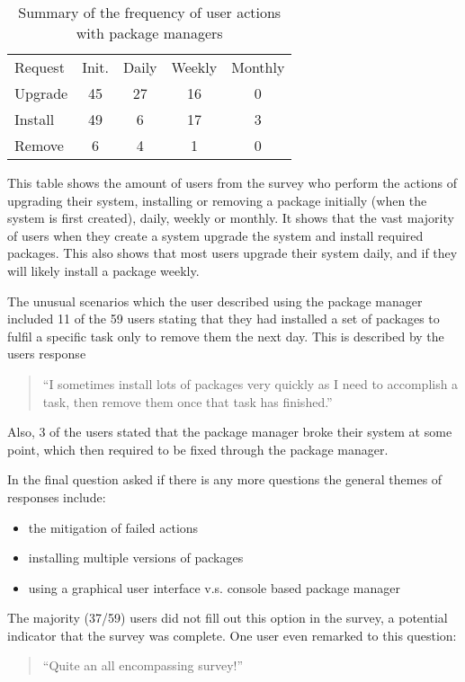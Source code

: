 \begin{table}[htp]
\begin{tabular}{l | c | c | c | c |}
Request & Init. & Daily & Weekly & Monthly \\
Upgrade  & 45 & 27 & 16 & 0 \\
Install & 49 & 6 & 17 & 3 \\
Remove & 6 & 4 & 1 & 0\\
\end{tabular}
\caption{Summary of the frequency of user actions with package managers}
\label{strat.tblaction}
\end{table}

This table shows the amount of users from the survey who perform the actions of upgrading their system, installing or removing a package 
initially (when the system is first created), daily, weekly or monthly.
It shows that the vast majority of users when they create a system upgrade the system and install required packages.
This also shows that most users upgrade their system daily, and if they will likely install a package weekly.

The unusual scenarios which the user described using the package manager included 
11 of the 59 users stating that they had installed a set of packages to fulfil a specific task only to remove them the next day.
This is described by the users response 
\begin{quote}
``I sometimes install lots of packages very quickly as I need to accomplish a task, then remove them once that task has finished.''
\end{quote}

Also, 3 of the users stated that the package manager broke their system at some point, which then required to be fixed through the package manager.

In the final question asked if there is any more questions the general themes of responses include:
\begin{itemize}
  \item the mitigation of failed actions
  \item installing multiple versions of packages
  \item using a graphical user interface v.s. console based package manager
\end{itemize} 
The majority (37/59) users did not fill out this option in the survey, a potential indicator that the survey was complete.
One user even remarked to this question:
\begin{quote}
``Quite an all encompassing survey!''
\end{quote}

